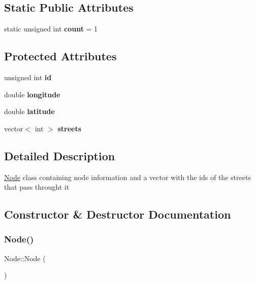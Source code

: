 \subsection*{Static Public Attributes}
\begin{DoxyCompactItemize}
\item 
\mbox{\label{class_node_ac862318be744cac98cdba7c7648a04d4}} 
static unsigned int {\bfseries count} = 1
\end{DoxyCompactItemize}
\subsection*{Protected Attributes}
\begin{DoxyCompactItemize}
\item 
\mbox{\label{class_node_adb90577d9d796c4ccbccf41ce2efc6c9}} 
unsigned int {\bfseries id}
\item 
\mbox{\label{class_node_af1772ed9e687d1e230f21c8fdf955ee9}} 
double {\bfseries longitude}
\item 
\mbox{\label{class_node_a18e537ee3be0b0f494e54d19486b532b}} 
double {\bfseries latitude}
\item 
\mbox{\label{class_node_ae028d72126fae2e69f65b230ef8b03ce}} 
vector$<$ int $>$ {\bfseries streets}
\end{DoxyCompactItemize}


\subsection{Detailed Description}
\mbox{\hyperlink{class_node}{Node}} class containing node information and a vector with the ids of the streets that pass throught it 

\subsection{Constructor \& Destructor Documentation}
\mbox{\label{class_node_a082d5efb0be81faaeb35dc02b2a4fc76}} 
\subsubsection{\texorpdfstring{Node()}{Node()}\hspace{0.1cm}{\footnotesize\ttfamily [1/2]}}
{\footnotesize\ttfamily Node\+::\+Node (\begin{DoxyParamCaption}{ }\end{DoxyParamCaption})\hspace{0.3cm}{\ttfamily [default]}}


